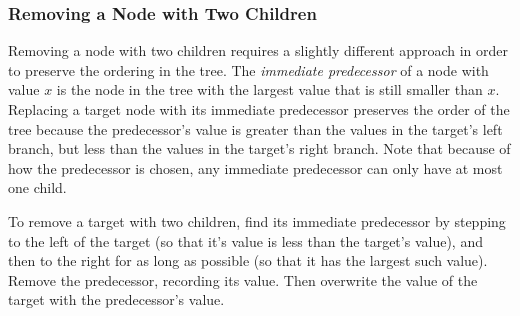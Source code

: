 \subsubsection*{Removing a Node with Two Children} %

Removing a node with two children requires a slightly different approach in order to preserve the ordering in the tree.
The \emph{immediate predecessor} of a node with value $x$ is the node in the tree with the largest value that is still smaller than $x$.
Replacing a target node with its immediate predecessor preserves the order of the tree because the predecessor's value is greater than the values in the target's left branch, but less than the values in the target's right branch.
Note that because of how the predecessor is chosen, any immediate predecessor can only have at most one child. %

To remove a target with two children, find its immediate predecessor by stepping to the left of the target (so that it's value is less than the target's value), and then to the right for as long as possible (so that it has the largest such value).
Remove the predecessor, recording its value.
Then overwrite the value of the target with the predecessor's value.

